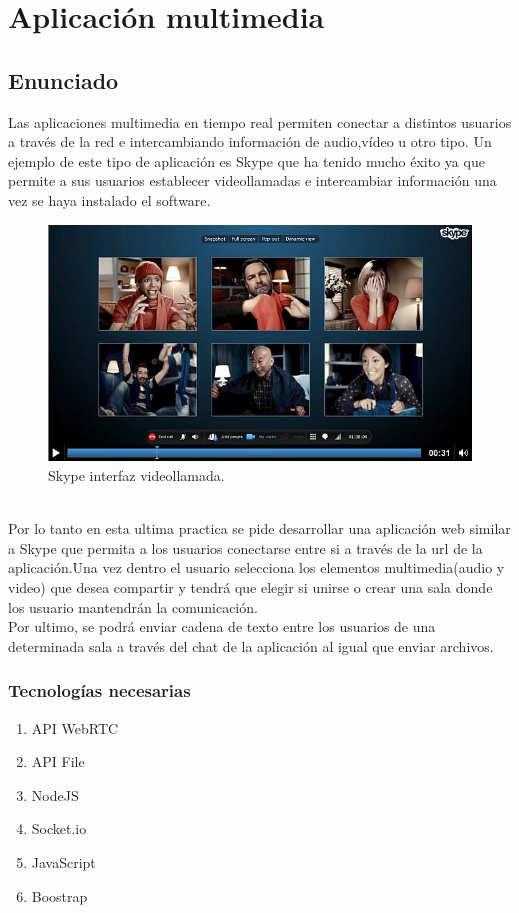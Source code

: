 \chapter{Aplicación multimedia}
\section{Enunciado}
Las aplicaciones multimedia en tiempo real permiten conectar a distintos usuarios a través de la red e intercambiando información de audio,vídeo u otro tipo. Un ejemplo de este tipo de aplicación es Skype que ha tenido mucho éxito ya que permite a sus usuarios establecer videollamadas e intercambiar información una vez se haya instalado el software.
\begin{figure}[!h]
\begin{center}
   \includegraphics[width=0.9\linewidth]{Figures/skype}
	\decoRule
	\caption[Ejemplo sitio Web]{Skype interfaz videollamada.}
\label{fig:canvasPrimitivas}
\end{center}
\end{figure}
\\Por lo tanto en esta ultima practica se pide desarrollar una aplicación web similar a Skype que permita a los usuarios conectarse entre si a través de la url de la aplicación.Una vez dentro el usuario selecciona los elementos multimedia(audio y video) que desea compartir y tendrá que elegir si unirse o crear una sala donde los usuario mantendrán la comunicación.
\\Por ultimo, se podrá enviar cadena de texto entre los usuarios de una determinada sala a través del chat de la aplicación al igual que enviar archivos.
\subsection{Tecnologías necesarias}
\begin{enumerate}
\item API WebRTC
\item API File
\item NodeJS
\item Socket.io
\item JavaScript
\item Boostrap
\end{enumerate}
